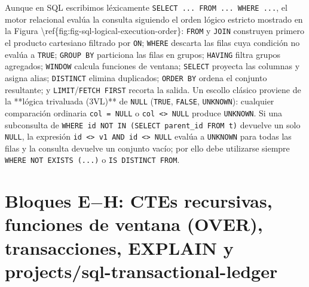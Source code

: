 \documentclass{book}
\begin{document}
Aunque en SQL escribimos léxicamente \texttt{SELECT ... FROM ... WHERE ...}, el motor relacional evalúa la consulta siguiendo el orden lógico estricto mostrado en la Figura \textbackslash{}ref\{fig:fig-sql-logical-execution-order\}: \texttt{FROM} y \texttt{JOIN} construyen primero el producto cartesiano filtrado por \texttt{ON}; \texttt{WHERE} descarta las filas cuya condición no evalúa a \texttt{TRUE}; \texttt{GROUP BY} particiona las filas en grupos; \texttt{HAVING} filtra grupos agregados; \texttt{WINDOW} calcula funciones de ventana; \texttt{SELECT} proyecta las columnas y asigna alias; \texttt{DISTINCT} elimina duplicados; \texttt{ORDER BY} ordena el conjunto resultante; y \texttt{LIMIT}/\texttt{FETCH FIRST} recorta la salida. Un escollo clásico proviene de la **lógica trivaluada (3VL)** de \texttt{NULL} (\texttt{TRUE}, \texttt{FALSE}, \texttt{UNKNOWN}): cualquier comparación ordinaria \texttt{col = NULL} o \texttt{col <> NULL} produce \texttt{UNKNOWN}. Si una subconsulta de \texttt{WHERE id NOT IN (SELECT parent\_id FROM t)} devuelve un solo \texttt{NULL}, la expresión \texttt{id <> v1 AND id <> NULL} evalúa a \texttt{UNKNOWN} para todas las filas y la consulta devuelve un conjunto vacío; por ello debe utilizarse siempre \texttt{WHERE NOT EXISTS (...)} o \texttt{IS DISTINCT FROM}.

\section{Bloques E\(-\)H: CTEs recursivas, funciones de ventana (OVER), transacciones, EXPLAIN y projects/sql-transactional-ledger}
\end{document}
